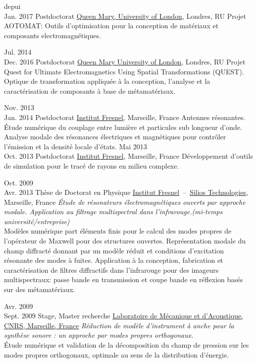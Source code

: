 \documentclass[]{cv} %
\begin{document}
\begin{entrylist}


\entry
{depui\\Jan. 2017}
{Postdoctorat}
{\href{http://antennas.eecs.qmul.ac.uk/}{Queen Mary, University of London}, Londres, RU}
{Projet AOTOMAT: Outils d'optimisation pour la conception de matériaux et composants electromagnétiques.
}

\entry
{Jul. 2014 \\Dec. 2016}
{Postdoctorat}
{\href{http://www.eecs.qmul.ac.uk}{Queen Mary University of London}, Londres, RU}
{Projet Quest for Ultimate Electromagnetics Using Spatial Transformations (QUEST).
Optique de transformation appliquée à la conception, l'analyse et la caractérisation de composants à base de métamatériaux.
}


\entry
{Nov. 2013\\Jan. 2014}
{Postdoctorat}
{\href{http://www.fresnel.fr/spip/}{Institut Fresnel}, Marseille, France}
{Antennes résonantes. \'Etude numérique du couplage entre lumière et particules sub longueur d'onde.
Analyse modale des résonances électriques et magnétiques pour contrôler l'émission et la densité locale d'états.
}
\entry
{Mai 2013 \\Oct. 2013}
{Postdoctorat}
{\href{http://www.fresnel.fr/spip/}{Institut Fresnel}, Marseille, France}
{Développement d'outils de simulation pour le tracé de rayons en milieu complexe.
}

\entry
{Oct. 2009\\Avr. 2013}
{Thèse de Doctorat en Physique}
{\href{http://www.fresnel.fr/spip/}{Institut Fresnel}~--~\href{http://www.silios.com/}{Silios Technologies}, Marseille, France}
{\emph{\'Etude de résonateurs électromagnétiques ouverts par approche modale.
Application au filtrage multispectral dans l'infrarouge.(mi-temps université/entreprise)}\\
Modèles numérique part éléments finis pour le calcul des modes propres de
 l'opérateur de Maxwell pour des structures ouvertes.
Représentation modale du champ diffracté donnant par un modèle réduit et conditions
d'excitation résonante des modes à fuites.
  Application à la conception, fabrication et caractérisation de
  filtres diffractifs dans l'infrarouge pour des imageurs multispectraux: passe bande en
   transmission et coupe bande en réflexion basés sur des métamatériaux.
}



\entry
{Avr. 2009 \\Sept. 2009}
{Stage, Master recherche}
{\href{http://www.lma.cnrs-mrs.fr/}{Laboratoire de Mécanique et d'Acoustique, CNRS, Marseille, France}}
{\emph{Réduction de modèle d'instrument à anche pour la synthèse sonore : un approche par modes propres orthogonaux.}\\
\'Etude numérique et validation de la décomposition du champ de pression
sur les modes propres orthogonaux, optimale au sens de la distribution d'énergie.
}


\end{entrylist}
\end{document}
